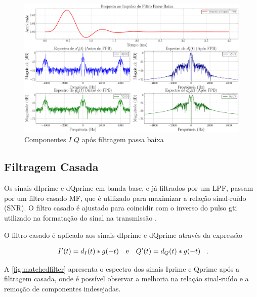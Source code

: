 \begin{figure}[H]
	\centering
	\caption{Componentes $I$ $Q$ após filtragem passa baixa}\label{fig:lowpassfilter}
	\includegraphics[width=\linewidth]{assets/cap2/lowpassfilter.pdf}
\end{figure}

\subsection{Filtragem Casada}

Os sinais \gls{dIprime} e \gls{dQprime} em banda base, e já filtrados por um \gls{LPF}, passam por um filtro casado \gls{MF}, que é utilizado para maximizar a relação sinal-ruído (\gls{SNR}). O filtro casado é ajustado para coincidir com o inverso do pulso  \gls{gti} utilizado na formatação do sinal na transmissão \cite{10555531840}. 

O filtro casado é aplicado aos sinais \gls{dIprime} e \gls{dQprime} através da expressão

\vspace{-1em}
\begin{equation}
    \begin{array}{c@{\quad\text{e}\quad}c}
        I'(t) = d_I(t) * g(-t) &
        Q'(t) = d_Q(t) * g(-t)
    \end{array} \text{ .}
\end{equation}


A \autoref{fig:matchedfilter} apresenta o espectro dos sinais \gls{Iprime} e \gls{Qprime} após a filtragem casada, onde é possível observar a melhoria na relação sinal-ruído e a remoção de componentes indesejadas. 

